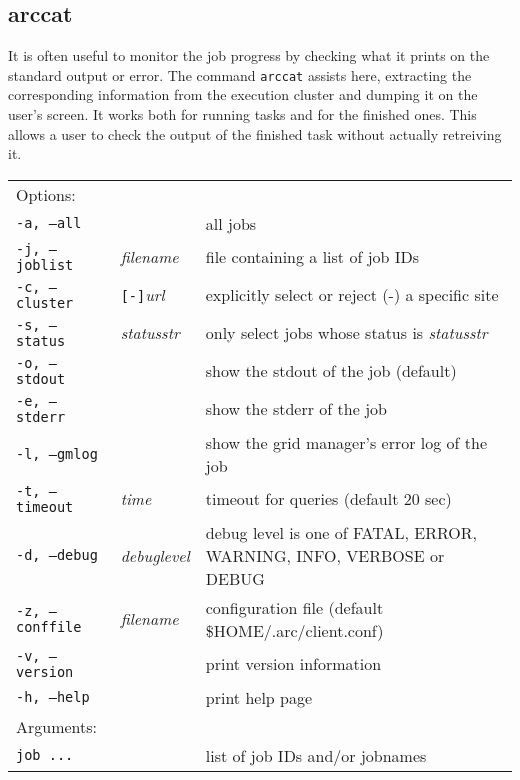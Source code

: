 \subsection{arccat}
\label{sec:arccat}

It is often useful to monitor the job progress by checking what it
prints on the standard output or error. The command \texttt{arccat}
 assists here, extracting the
corresponding information from the execution cluster and dumping it
on the user's screen. It works both for running tasks and for the
finished ones. This allows a user to check the output of the
finished task without actually retreiving it.

\hspace*{0.5cm}
\begin{shaded}
\end{shaded}
\begin{longtable}{llp{8cm}}
   Options:&&\\
   \texttt{-a, --all}& & all jobs\\
   \texttt{-j, --joblist}& \textit{filename} & file containing a list of job IDs\\
   \texttt{-c, --cluster}&\verb#[-]#\textit{url}&explicitly select or reject (-) a specific site\\
   \texttt{-s, --status}& \textit{statusstr} &only select jobs whose status is \textit{statusstr}\\
   \texttt{-o, --stdout}& & show the stdout of the job (default)\\
   \texttt{-e, --stderr}& & show the stderr of the job\\
   \texttt{-l, --gmlog}& & show the grid manager's error log of the job\\
   \texttt{-t, --timeout}& \textit{time} & timeout for queries (default 20 sec)\\
   \texttt{-d, --debug}& \textit{debuglevel}&debug level is one of  FATAL, ERROR, WARNING, INFO, VERBOSE or DEBUG\\
   \texttt{-z, --conffile}&\textit{filename}& configuration file (default {\$}HOME/.arc/client.conf)\\
   \texttt{-v, --version}& & print version information\\
   \texttt{-h, --help}& & print help page\\
   Arguments:&&\\
   \texttt{job ...} && list of job IDs and/or jobnames\\
\end{longtable}

